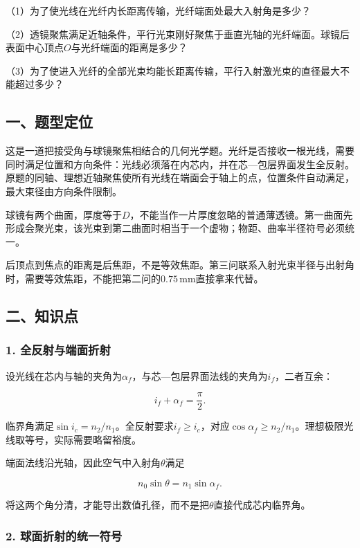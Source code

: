 \documentclass[12pt,a4paper,fontset=fandol]{ctexart}
\begin{document}
（1）为了使光线在光纤内长距离传输，光纤端面处最大入射角是多少？

（2）透镜聚焦满足近轴条件，平行光束刚好聚焦于垂直光轴的光纤端面。球镜后表面中心顶点\(O\)与光纤端面的距离是多少？

（3）为了使进入光纤的全部光束均能长距离传输，平行入射激光束的直径最大不能超过多少？

\subsection{一、题型定位}\label{ux4e00ux9898ux578bux5b9aux4f4d-4}

这是一道把接受角与球镜聚焦相结合的几何光学题。光纤是否接收一根光线，需要同时满足位置和方向条件：光线必须落在内芯内，并在芯---包层界面发生全反射。原题的同轴、理想近轴聚焦使所有光线在端面会于轴上的点，位置条件自动满足，最大束径由方向条件限制。

球镜有两个曲面，厚度等于\(D\)，不能当作一片厚度忽略的普通薄透镜。第一曲面先形成会聚光束，该光束到第二曲面时相当于一个虚物；物距、曲率半径符号必须统一。

后顶点到焦点的距离是后焦距，不是等效焦距。第三问联系入射光束半径与出射角时，需要等效焦距，不能把第二问的\(0.75\,\mathrm{mm}\)直接拿来代替。

\subsection{二、知识点}\label{ux4e8cux77e5ux8bc6ux70b9-4}

\subsubsection{1.
全反射与端面折射}\label{ux5168ux53cdux5c04ux4e0eux7aefux9762ux6298ux5c04}

设光线在芯内与轴的夹角为\(\alpha_f\)，与芯---包层界面法线的夹角为\(i_f\)，二者互余：

\[
i_f+\alpha_f=\frac{\pi}{2}.
\]

临界角满足\(\sin i_c=n_2/n_1\)。全反射要求\(i_f\ge i_c\)，对应\(\cos\alpha_f\ge n_2/n_1\)。理想极限光线取等号，实际需要略留裕度。

端面法线沿光轴，因此空气中入射角\(\theta\)满足

\[
n_0\sin\theta=n_1\sin\alpha_f.
\]

将这两个角分清，才能导出数值孔径，而不是把\(\theta\)直接代成芯内临界角。

\subsubsection{2.
球面折射的统一符号}\label{ux7403ux9762ux6298ux5c04ux7684ux7edfux4e00ux7b26ux53f7}
\end{document}
